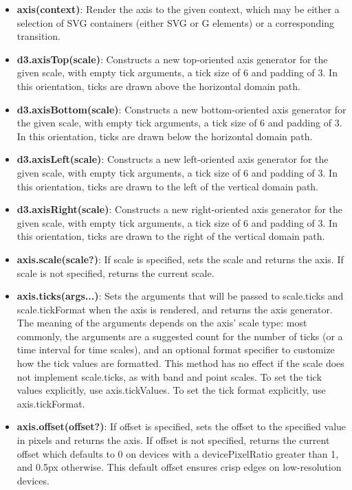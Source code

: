 \documentclass{report}
\begin{document}
\begin{itemize}
            \begin{itemize}
                \item \textbf{axis(context)}: Render the axis to the given context, which may be either a selection of SVG containers (either SVG or G elements) or a corresponding transition.
                \item \textbf{d3.axisTop(scale)}: Constructs a new top-oriented axis generator for the given scale, with empty tick arguments, a tick size of 6 and padding of 3. In this orientation, ticks are drawn above the horizontal domain path.
                \item \textbf{d3.axisBottom(scale)}: Constructs a new bottom-oriented axis generator for the given scale, with empty tick arguments, a tick size of 6 and padding of 3. In this orientation, ticks are drawn below the horizontal domain path.
                \item \textbf{d3.axisLeft(scale)}: Constructs a new left-oriented axis generator for the given scale, with empty tick arguments, a tick size of 6 and padding of 3. In this orientation, ticks are drawn to the left of the vertical domain path.
                \item \textbf{d3.axisRight(scale)}: Constructs a new right-oriented axis generator for the given scale, with empty tick arguments, a tick size of 6 and padding of 3. In this orientation, ticks are drawn to the right of the vertical domain path.
                \item \textbf{axis.scale(scale?)}: If scale is specified, sets the scale and returns the axis. If scale is not specified, returns the current scale.
                \item \textbf{axis.ticks(args...)}: Sets the arguments that will be passed to scale.ticks and scale.tickFormat when the axis is rendered, and returns the axis generator. The meaning of the arguments depends on the axis’ scale type: most commonly, the arguments are a suggested count for the number of ticks (or a time interval for time scales), and an optional format specifier to customize how the tick values are formatted.
                    \bigbreak \noindent 
                    This method has no effect if the scale does not implement scale.ticks, as with band and point scales. To set the tick values explicitly, use axis.tickValues. To set the tick format explicitly, use axis.tickFormat.
                \item \textbf{axis.offset(offset?)}: If offset is specified, sets the offset to the specified value in pixels and returns the axis. If offset is not specified, returns the current offset which defaults to 0 on devices with a devicePixelRatio greater than 1, and 0.5px otherwise. This default offset ensures crisp edges on low-resolution devices.

\end{itemize}
\end{itemize}
\end{document}
